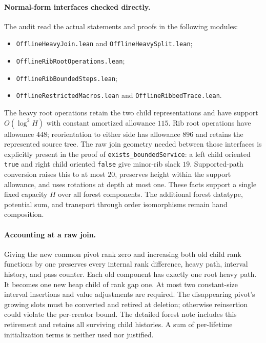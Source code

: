 \documentclass[11pt]{article}
\begin{document}
\paragraph{Normal-form interfaces checked directly.}
The audit read the actual statements and proofs in the following modules:
\begin{itemize}
\item \texttt{OfflineHeavyJoin.lean} and \texttt{OfflineHeavySplit.lean};
\item \texttt{OfflineRibRootOperations.lean};
\item \texttt{OfflineRibBoundedSteps.lean};
\item \texttt{OfflineRestrictedMacros.lean} and \texttt{OfflineRibbedTrace.lean}.
\end{itemize}
The heavy root operations retain the two child representations and
have support $O(\log^2H)$ with constant amortized allowance $115$.
Rib root operations have allowance $448$; reorientation to either side
has allowance $896$ and retains the represented source tree.
The raw join geometry needed between those interfaces is explicitly
present in the proof of \texttt{exists\_boundedService}: a left child
oriented \texttt{true} and right child oriented \texttt{false} give
minor-rib slack $19$. Supported-path conversion raises this to at most
$20$, preserves height within the support allowance, and uses rotations
at depth at most one. These facts support a single fixed capacity $H$
over all forest components. The additional forest datatype, potential
sum, and transport through order isomorphisms remain hand composition.

\paragraph{Accounting at a raw join.}
Giving the new common pivot rank zero and increasing both old child
rank functions by one preserves every internal rank difference, heavy
path, interval history, and pass counter. Each old component has exactly
one root heavy path. It becomes one new heap child of rank gap one.
At most two constant-size interval insertions and value adjustments
are required. The disappearing pivot's growing slots must be converted
and retired at deletion; otherwise reinsertion could violate the
per-creator bound. The detailed forest note includes this retirement
and retains all surviving child histories. A sum of per-lifetime
initialization terms is neither used nor justified.
\end{document}
